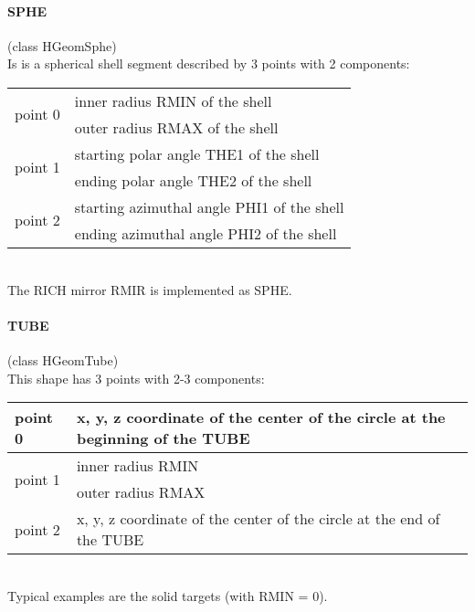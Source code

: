 \newpage
\paragraph{SPHE} (class HGeomSphe)\\
Is is a spherical shell segment described by 3 points with 2 components:\\
\begin{tabular}{|l|l|}
  \hline
  \multirow{2}{*}{point 0} & inner radius RMIN of the shell\\ 
                           & outer radius RMAX of the shell\\
  \hline
  \multirow{2}{*}{point 1} & starting polar angle THE1 of the shell\\ 
                           & ending polar angle THE2 of the shell\\
  \hline
  \multirow{2}{*}{point 2} & starting azimuthal angle PHI1 of the shell\\ 
                           & ending azimuthal angle PHI2 of the shell\\
  \hline
\end{tabular}\\[1.5px]
The RICH mirror RMIR is implemented as SPHE.

\paragraph{TUBE} (class HGeomTube)\\
This shape has 3 points with 2-3 components:\\
\begin{tabular}{|l|l|}
  \hline
  point 0                  & x, y, z coordinate of the center of the circle at the beginning of the TUBE\\
  \hline
  \multirow{2}{*}{point 1} & inner radius RMIN\\
                           & outer radius RMAX\\
  \hline
  point 2                  & x, y, z coordinate of the center of the circle at the end of the TUBE\\
  \hline
\end{tabular}\\[1.5px]
Typical examples are the solid targets (with RMIN = 0).

